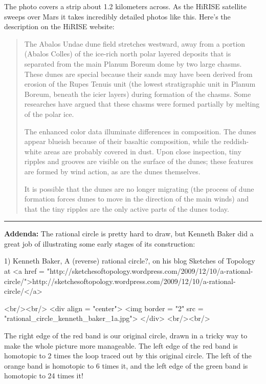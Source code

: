 The photo covers a strip about 1.2 kilometers across.  As the HiRISE
satellite sweeps over Mars it takes incredibly detailed photos like
this.  Here's the description on the HiRISE website:

\begin{quote}
     The Abalos Undae dune field stretches westward, away from a
     portion (Abalos Colles) of the ice-rich north polar layered
     deposits that is separated from the main Planum Boreum dome by
     two large chasms.  These dunes are special because their sands 
     may have been derived from erosion of the Rupes Tenuis unit (the
     lowest stratigraphic unit in Planum Boreum, beneath the icier
     layers) during formation of the chasms.  Some researches have
     argued that these chasms were formed partially by melting of the
     polar ice.

     The enhanced color data illuminate differences in composition.  
     The dunes appear blueish because of their basaltic composition, 
     while the reddish-white areas are probably covered in dust.  
     Upon close inspection, tiny ripples and grooves are visible on 
     the surface of the dunes; these features are formed by wind 
     action, as are the dunes themselves.

     It is possible that the dunes are no longer migrating (the
     process of dune formation forces dunes to move in the direction
     of the main winds) and that the tiny ripples are the only active
     parts of the dunes today.
\end{quote}
    

\par\noindent\rule{\textwidth}{0.4pt}
\textbf{Addenda:} 
The rational circle is pretty hard to draw, but Kenneth Baker did
a great job of illustrating some early stages of its construction:


1) Kenneth Baker, A (reverse) rational circle?, on his blog Sketches
of Topology at <a href =
"http://sketchesoftopology.wordpress.com/2009/12/10/a-rational-circle/">http://sketchesoftopology.wordpress.com/2009/12/10/a-rational-circle/</a>

<br/><br/>
<div align = "center">
<img border = "2" src = "rational_circle_kenneth_baker_1a.jpg">
</div>
<br/><br/>

The right edge of the red band is our original circle, drawn in a
tricky way to make the whole picture more manageable.  The left edge
of the red band is homotopic to 2 times the loop traced out by this
original circle.  The left of the orange band is homotopic to 6 times
it, and the left edge of the green band is homotopic to 24 times it!

